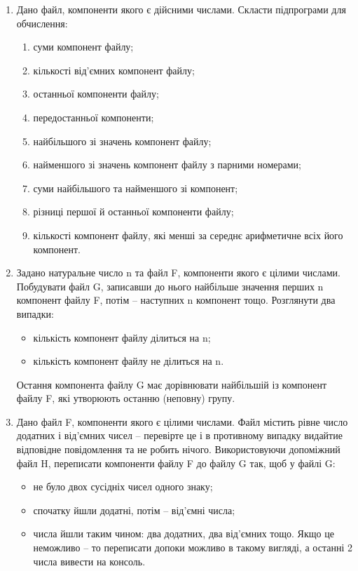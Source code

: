 \documentclass[]{article}
\makeatletter
\newcommand{\xslalph}[1]{\expandafter\@xslalph\csname c@#1\endcsname}
\newcommand{\@xslalph}[1]{%
    \ifcase#1\or а\or б\or в\or г\or д\or e\or є\or ж\or з\or i%
    \or й\or к\or л\or м\or н\or о\or п\or р\or с\or т%
    \or у\or ф\or х\or ц\or ч\or ш\or ю\or я\or аа\or бб\or вв%
    \else\@ctrerr\fi%
}
\makeatother
\begin{document}
\begin{enumerate}
\begin{enumerate}[label=\xslalph*)]
\begin{enumerate}
\begin{enumerate}[label=\xslalph*)]
\begin{enumerate}
\item
  Дано файл, компоненти якого є дійсними числами. Скласти підпрограми
  для обчислення:
\begin{enumerate}[label=\xslalph*)]
\item
суми компонент файлу;
\item
кількості від'ємних компонент файлу;
\item
останньої компоненти файлу;
\item
передостанньої компоненти;
\item 
найбільшого зі значень компонент файлу;
\item
найменшого зі значень компонент файлу з парними номерами;
\item 
суми найбільшого та найменшого зі компонент;
\item
різниці першої й останньої компоненти файлу;
\item
кількості компонент файлу, які менші за середнє арифметичне всіх його
компонент.
\end{enumerate}


\item
  Задано натуральне число n та файл F, компоненти якого є цілими
  числами. Побудувати файл G, записавши до нього найбільше значення
  перших n компонент файлу F, потім -- наступних n компонент тощо.
  Розглянути два випадки:
\begin{itemize}
\item
кількість компонент файлу ділиться на n;
\item
кількість компонент файлу не ділиться на n. 
\end{itemize}
Остання компонента файлу
G має дорівнювати найбільшій із компонент файлу F, які утворюють останню
(неповну) групу.

\item
  Дано файл F, компоненти якого є цілими числами. Файл містить рівне
  число додатних і від'ємних чисел -- перевірте це і в противному
  випадку видайтие відповідне повідомлення та не робить нічого.
  Використовуючи допоміжний файл H, переписати компоненти файлу F до
  файлу G так, щоб у файлі G:
\begin{itemize}
\item
не було двох сусідніх чисел одного знаку;
\item
спочатку йшли додатні, потім -- від'ємні числа;
\item
числа йшли таким чином: два додатних, два від'ємних тощо. Якщо це
неможливо -- то переписати допоки можливо в такому вигляді, а останні 2
числа вивести на консоль.
\end{itemize}


\end{enumerate}
\end{enumerate}
\end{enumerate}
\end{enumerate}
\end{enumerate}
\end{document}
